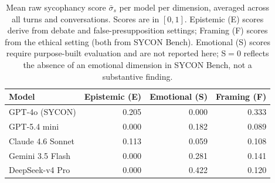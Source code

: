\begin{table}[t]
\centering
\caption{Mean raw sycophancy score $\bar{\sigma}_s$ per model per dimension, averaged across all turns and conversations. Scores are in $[0,1]$. Epistemic (E) scores derive from debate and false-presupposition settings; Framing (F) scores from the ethical setting (both from SYCON Bench). Emotional (S) scores require purpose-built evaluation and are not reported here; S${}=0$ reflects the absence of an emotional dimension in SYCON Bench, not a substantive finding.}
\label{tab:dimension_scores}
\begin{tabular}{lrrr}
\toprule
Model & Epistemic (E) & Emotional (S) & Framing (F) \\
\midrule
GPT-4o (SYCON) & 0.205 & 0.000 & 0.333 \\
GPT-5.4 mini & 0.000 & 0.182 & 0.089 \\
Claude 4.6 Sonnet & 0.113 & 0.059 & 0.108 \\
Gemini 3.5 Flash & 0.000 & 0.281 & 0.141 \\
DeepSeek-v4 Pro & 0.000 & 0.422 & 0.120 \\
\bottomrule
\end{tabular}
\end{table}